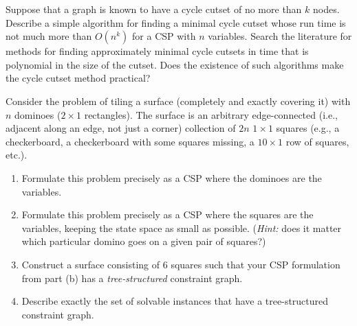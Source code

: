 \begin{exercise}
\libex Suppose that a graph is known to have a cycle cutset of no more
than \(k\) nodes. Describe a simple algorithm for finding a minimal
cycle cutset whose run time is not much more than \(O(n^k)\) for a CSP with
\(n\) variables. Search the literature for methods for finding
approximately minimal cycle cutsets in time that is polynomial in the size
of the cutset. Does the existence of such algorithms make the cycle
cutset method practical?
\end{exercise} 

\begin{iexercise}
Consider the problem of tiling a
surface (completely and exactly covering it) with \(n\) dominoes (\(2\times
1\) rectangles). The surface is an arbitrary edge-connected (i.e.,
adjacent along an edge, not just a corner) collection of
\(2n\) \(1\times 1\) squares (e.g., a checkerboard, a checkerboard with some
squares missing, a \(10\times 1\) row of squares, etc.).
\begin{enumerate}
\item Formulate this problem precisely as a CSP where
the dominoes are the variables.
\item Formulate this problem precisely as a CSP where
the squares are the variables, keeping the state space as small as possible.
({\em Hint:} does it matter which particular domino goes on a given pair of squares?)
\item Construct a surface consisting of 6 squares such that
your CSP formulation from part (b) has a {\em tree-structured}
constraint graph.
\item Describe exactly the set of solvable instances
that have a tree-structured constraint graph.
\end{enumerate}
\end{iexercise} 












